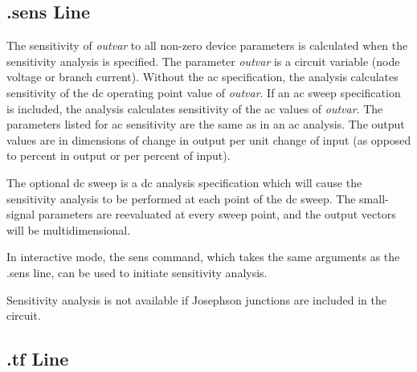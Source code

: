 \subsection{{\vt .sens} Line}
\label{sensline}



The sensitivity of {\it outvar\/} to all non-zero device parameters is
calculated when the sensitivity analysis is specified.  The parameter
{\it outvar\/} is a circuit variable (node voltage or branch current). 
Without the ac specification, the analysis calculates sensitivity of
the dc operating point value of {\it outvar\/}.  If an ac sweep
specification is included, the analysis calculates sensitivity of the
ac values of {\it outvar\/}.  The parameters listed for ac sensitivity
are the same as in an ac analysis.  The output values are in
dimensions of change in output per unit change of input (as opposed to
percent in output or per percent of input).

The optional dc sweep is a dc analysis specification which will cause
the sensitivity analysis to be performed at each point of the dc
sweep.  The small-signal parameters are reevaluated at every sweep
point, and the output vectors will be multidimensional.

In interactive mode, the {\cb sens} command, which takes the same
arguments as the {\vt .sens} line, can be used to initiate sensitivity
analysis.

Sensitivity analysis is not available if Josephson junctions are
included in the circuit.

\subsection{{\vt .tf} Line}
\label{tfline}



